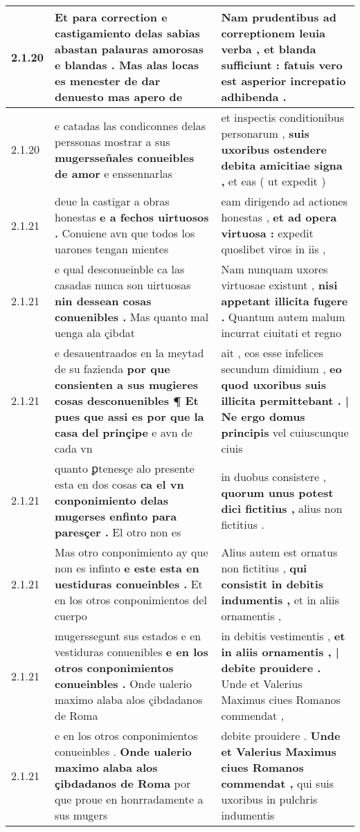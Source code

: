 \begin{tabular}{|p{1cm}|p{6.5cm}|p{6.5cm}|}
2.1.20 & Et para correction e castigamiento delas sabias \textbf{ abastan palauras amorosas e blandas . } Mas alas locas es menester de dar denuesto mas apero de & Nam prudentibus ad correptionem leuia verba , \textbf{ et blanda sufficiunt : } fatuis vero est asperior increpatio adhibenda . \\\hline
2.1.20 & e catadas las condiconnes delas perssonas mostrar a sus \textbf{ mugersseñales conueibles de amor } e enssennarlas & et inspectis conditionibus personarum , \textbf{ suis uxoribus ostendere debita amicitiae signa , } et eas ( ut expedit ) \\\hline
2.1.21 & deue la castigar a obras honestas \textbf{ e a fechos uirtuosos . } Conuiene avn que todos los uarones tengan mientes & eam dirigendo ad actiones honestas , \textbf{ et ad opera virtuosa : } expedit quoslibet viros in iis , \\\hline
2.1.21 & e qual desconueinble ca las casadas nunca son uirtuosas \textbf{ nin dessean cosas conuenibles . } Mas quanto mal uenga ala çibdat & Nam nunquam uxores virtuosae existunt , \textbf{ nisi appetant illicita fugere . } Quantum autem malum incurrat ciuitati et regno \\\hline
2.1.21 & e desauentraados en la meytad de su fazienda \textbf{ por que consienten a sus mugieres cosas desconuenibles ¶ Et pues que assi es por que la casa del prinçipe } e avn de cada vn & ait , eos esse infelices secundum dimidium , \textbf{ eo quod uxoribus suis illicita permittebant . | Ne ergo domus principis } vel cuiuscunque ciuis \\\hline
2.1.21 & quanto ꝑtenesçe alo presente esta en dos cosas \textbf{ ca el vn conponimiento delas mugerses enfinto para paresçer . } El otro non es & in duobus consistere , \textbf{ quorum unus potest dici fictitius , } alius non fictitius . \\\hline
2.1.21 & Mas otro conponimiento ay que non es infinto \textbf{ e este esta en uestiduras conueinbles . } Et en los otros conponimientos del cuerpo & Alius autem est ornatus non fictitius , \textbf{ qui consistit in debitis indumentis , } et in aliis ornamentis , \\\hline
2.1.21 & mugerssegunt sus estados e en vestiduras conuenibles \textbf{ e en los otros conponimientos conueinbles . } Onde ualerio maximo alaba alos çibdadanos de Roma & in debitis vestimentis , \textbf{ et in aliis ornamentis , | debite prouidere . } Unde et Valerius Maximus ciues Romanos commendat , \\\hline
2.1.21 & e en los otros conponimientos conueinbles . \textbf{ Onde ualerio maximo alaba alos çibdadanos de Roma } por que proue en honrradamente a sus mugers & debite prouidere . \textbf{ Unde et Valerius Maximus ciues Romanos commendat , } qui suis uxoribus in pulchris indumentis \\\hline

\end{tabular}
